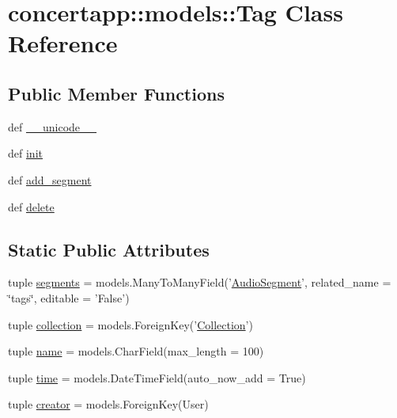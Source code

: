 \hypertarget{classconcertapp_1_1models_1_1_tag}{
\section{concertapp::models::Tag Class Reference}
\label{classconcertapp_1_1models_1_1_tag}
}
\subsection*{Public Member Functions}
\begin{DoxyCompactItemize}
\item 
def \hyperlink{classconcertapp_1_1models_1_1_tag_a9adeb3d43f7a44a996f5c4295e6d3a05}{\_\-\_\-unicode\_\-\_\-}
\item 
def \hyperlink{classconcertapp_1_1models_1_1_tag_a61e8d941da1c8c55c7509d69e81f1326}{init}
\item 
def \hyperlink{classconcertapp_1_1models_1_1_tag_a48b03cb24a5cdf65b920650c3ab8a6b8}{add\_\-segment}
\item 
def \hyperlink{classconcertapp_1_1models_1_1_tag_a96dc85f230239852dc02553f2bdc6e1a}{delete}
\end{DoxyCompactItemize}
\subsection*{Static Public Attributes}
\begin{DoxyCompactItemize}
\item 
tuple \hyperlink{classconcertapp_1_1models_1_1_tag_a7240d312ef18ba168eeba6f5bd8efbab}{segments} = models.ManyToManyField('\hyperlink{classconcertapp_1_1models_1_1_audio_segment}{AudioSegment}', related\_\-name = \char`\"{}tags\char`\"{}, editable = 'False')
\item 
tuple \hyperlink{classconcertapp_1_1models_1_1_tag_aabb7ec66b759513fd8c2c7f7314571b2}{collection} = models.ForeignKey('\hyperlink{classconcertapp_1_1models_1_1_collection}{Collection}')
\item 
tuple \hyperlink{classconcertapp_1_1models_1_1_tag_a004abf3b743cd22d1f0c3fd0a4fe4549}{name} = models.CharField(max\_\-length = 100)
\item 
tuple \hyperlink{classconcertapp_1_1models_1_1_tag_aae92f65925072a9f91d2affdb0e18083}{time} = models.DateTimeField(auto\_\-now\_\-add = True)
\item 
tuple \hyperlink{classconcertapp_1_1models_1_1_tag_a692a1d50db618d8ab0224235f54366a1}{creator} = models.ForeignKey(User)
\end{DoxyCompactItemize}


